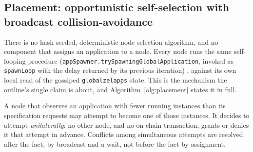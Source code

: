\subsection{Placement: opportunistic self-selection with broadcast collision-avoidance}
\label{sec:fluxos-placement}

There is no hash-seeded, deterministic node-selection algorithm, and no component that assigns an
application to a node. Every node runs the same self-looping procedure
(\texttt{appSpawner.\allowbreak{}trySpawningGlobalApplication}, invoked as \texttt{spawnLoop} with the delay
returned by its previous iteration) ,
against its own local read of the gossiped \texttt{globalzelapps} state. This is the mechanism the
outline's single claim is about, and Algorithm~\ref{alg:placement} states it in full.

\begin{definition}
A node that observes an application with fewer running instances than its specification requests
may attempt to become one of those instances. It decides to attempt \emph{unilaterally}: no other
node, and no on-chain transaction, grants or denies it that attempt in advance. Conflicts among
simultaneous attempts are resolved after the fact, by broadcast and a wait, not before the fact by
assignment.
\end{definition}

